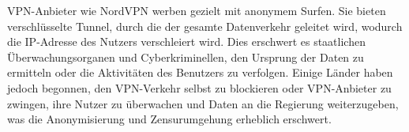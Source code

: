 \gls{VPN}-Anbieter wie NordVPN werben gezielt mit anonymem Surfen. Sie bieten verschlüsselte Tunnel, durch die der gesamte Datenverkehr geleitet wird, wodurch die \gls{IP}-Adresse des Nutzers verschleiert wird. Dies erschwert es staatlichen Überwachungsorganen und Cyberkriminellen, den Ursprung der Daten zu ermitteln oder die Aktivitäten des Benutzers zu verfolgen. Einige Länder haben jedoch begonnen, den \gls{VPN}-Verkehr selbst zu blockieren oder \gls{VPN}-Anbieter zu zwingen, ihre Nutzer zu überwachen und Daten an die Regierung weiterzugeben, was die Anonymisierung und Zensurumgehung erheblich erschwert.